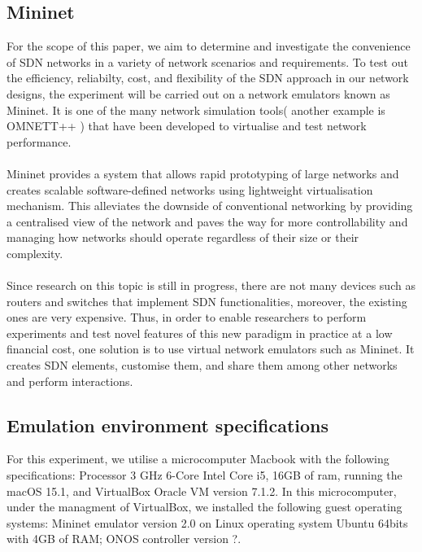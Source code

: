\documentclass{article}
\begin{document}
\subsection{Mininet}
For the scope of this paper, we aim to determine and investigate the convenience of SDN networks in a variety of network scenarios and requirements. To test out the efficiency, reliabilty, cost, and flexibility of the SDN approach in our network designs, the experiment will be carried out on a network emulators known as Mininet. It is one of the many network simulation tools( another example is OMNETT++ ) that have been developed to virtualise and test network performance\cite{10220519, Haji_Zeebaree_Saeed_Ameen_Shukur_Omar_Sadeeq_Ageed_Ibrahim_Yasin_2021}. \\\\ Mininet\cite{6860404} provides a system that allows rapid prototyping of large networks and creates scalable software-defined networks using lightweight virtualisation mechanism. This alleviates the downside of conventional networking by providing a centralised view of the network and paves the way for more controllability and managing how networks should operate regardless of their size or their complexity. \\\\
Since research on this topic is still in progress, there are not many devices such as routers and switches that implement SDN functionalities, moreover, the existing ones are very expensive. Thus, in order to enable researchers to perform experiments and test novel features of this new paradigm in practice at a low financial cost, one solution is to use virtual network emulators such as Mininet. It creates SDN elements, customise them, and share them among other networks and perform interactions\cite{6860404}.

\newpage
\subsection{Emulation environment specifications}
For this experiment, we utilise a microcomputer Macbook with the following specifications: Processor 3 GHz 6-Core Intel Core i5, 16GB of ram, running the macOS 15.1, and VirtualBox Oracle VM version 7.1.2.
In this microcomputer, under the managment of VirtualBox, we installed the following guest operating systems: Mininet emulator version 2.0 on Linux operating system Ubuntu 64bits with 4GB of RAM; ONOS controller version ?.
\end{document}
